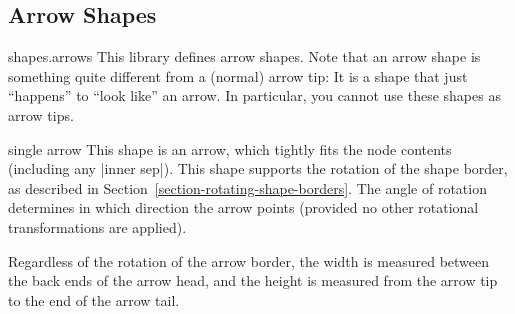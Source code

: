 \subsection{Arrow Shapes}

\begin{pgflibrary}{shapes.arrows}
    This library defines arrow shapes. Note that an arrow shape is something
    quite different from a (normal) arrow tip: It is a shape that just
    ``happens'' to ``look like'' an arrow. In particular, you cannot use these
    shapes as arrow tips.
\end{pgflibrary}

\begin{shape}{single arrow}
    This shape is an arrow, which tightly fits the node contents (including any
    |inner sep|). This shape supports the rotation of the shape border, as
    described in Section~\ref{section-rotating-shape-borders}. The angle of
    rotation determines in which direction the arrow points (provided no other
    rotational transformations are applied).
\begin{codeexample}[preamble={\usetikzlibrary{shapes.arrows}}]
\end{codeexample}

    Regardless of the rotation of the arrow border, the width is measured
    between the back ends of the arrow head, and the height is measured from
    the arrow tip to the end of the arrow tail.
\begin{codeexample}[preamble={\usetikzlibrary{shapes.arrows}}]
\end{codeexample}


\end{shape}
